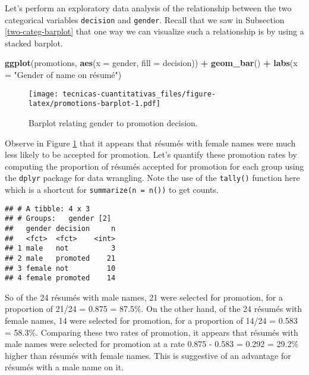\documentclass[
]{book}
\newenvironment{Shaded}{\begin{snugshade}}{\end{snugshade}}
\newcommand{\DataTypeTok}[1]{\textcolor[rgb]{0.13,0.29,0.53}{#1}}
\newcommand{\KeywordTok}[1]{\textcolor[rgb]{0.13,0.29,0.53}{\textbf{#1}}}
\newcommand{\NormalTok}[1]{#1}
\newcommand{\OperatorTok}[1]{\textcolor[rgb]{0.81,0.36,0.00}{\textbf{#1}}}
\newcommand{\StringTok}[1]{\textcolor[rgb]{0.31,0.60,0.02}{#1}}
\begin{document}
Let's perform an exploratory data analysis of the relationship between the two categorical variables \texttt{decision} and \texttt{gender}. Recall that we saw in Subsection \ref{two-categ-barplot} that one way we can visualize such a relationship is by using a stacked barplot.

\begin{Shaded}
\begin{Highlighting}[]
\KeywordTok{ggplot}\NormalTok{(promotions, }\KeywordTok{aes}\NormalTok{(}\DataTypeTok{x =}\NormalTok{ gender, }\DataTypeTok{fill =}\NormalTok{ decision)) }\OperatorTok{+}
\StringTok{  }\KeywordTok{geom_bar}\NormalTok{() }\OperatorTok{+}
\StringTok{  }\KeywordTok{labs}\NormalTok{(}\DataTypeTok{x =} \StringTok{"Gender of name on résumé"}\NormalTok{)}
\end{Highlighting}
\end{Shaded}

\begin{figure}
\centering
\texttt{[image: tecnicas-cuantitativas\_files/figure-latex/promotions-barplot-1.pdf]}
\caption{\label{fig:promotions-barplot}Barplot relating gender to promotion decision.}
\end{figure}

Observe in Figure \ref{fig:promotions-barplot} that it appears that résumés with female names were much less likely to be accepted for promotion. Let's quantify these promotion rates by computing the proportion of résumés accepted for promotion for each group using the \texttt{dplyr} package for data wrangling. Note the use of the \texttt{tally()} function here which is a shortcut for \texttt{summarize(n\ =\ n())} to get counts.

\begin{Shaded}
\end{Shaded}

\begin{verbatim}
## # A tibble: 4 x 3
## # Groups:   gender [2]
##   gender decision     n
##   <fct>  <fct>    <int>
## 1 male   not          3
## 2 male   promoted    21
## 3 female not         10
## 4 female promoted    14
\end{verbatim}

So of the 24 résumés with male names, 21 were selected for promotion, for a proportion of 21/24 = 0.875 = 87.5\%. On the other hand, of the 24 résumés with female names, 14 were selected for promotion, for a proportion of 14/24 = 0.583 = 58.3\%. Comparing these two rates of promotion, it appears that résumés with male names were selected for promotion at a rate 0.875 - 0.583 = 0.292 = 29.2\% higher than résumés with female names. This is suggestive of an advantage for résumés with a male name on it.
\end{document}
